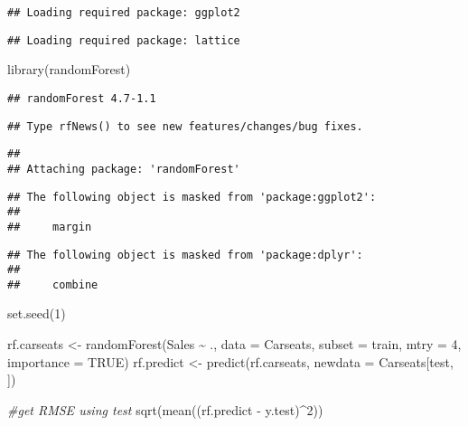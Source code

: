 \documentclass[
]{article}
\newenvironment{Shaded}{\begin{snugshade}}{\end{snugshade}}
\newcommand{\AttributeTok}[1]{\textcolor[rgb]{0.77,0.63,0.00}{#1}}
\newcommand{\CommentTok}[1]{\textcolor[rgb]{0.56,0.35,0.01}{\textit{#1}}}
\newcommand{\ConstantTok}[1]{\textcolor[rgb]{0.00,0.00,0.00}{#1}}
\newcommand{\DecValTok}[1]{\textcolor[rgb]{0.00,0.00,0.81}{#1}}
\newcommand{\FunctionTok}[1]{\textcolor[rgb]{0.00,0.00,0.00}{#1}}
\newcommand{\NormalTok}[1]{#1}
\newcommand{\OtherTok}[1]{\textcolor[rgb]{0.56,0.35,0.01}{#1}}
\newcommand{\SpecialCharTok}[1]{\textcolor[rgb]{0.00,0.00,0.00}{#1}}
\begin{document}
\begin{verbatim}
## Loading required package: ggplot2
\end{verbatim}

\begin{verbatim}
## Loading required package: lattice
\end{verbatim}

\begin{Shaded}
\begin{Highlighting}[]
\FunctionTok{library}\NormalTok{(randomForest)}
\end{Highlighting}
\end{Shaded}

\begin{verbatim}
## randomForest 4.7-1.1
\end{verbatim}

\begin{verbatim}
## Type rfNews() to see new features/changes/bug fixes.
\end{verbatim}

\begin{verbatim}
## 
## Attaching package: 'randomForest'
\end{verbatim}

\begin{verbatim}
## The following object is masked from 'package:ggplot2':
## 
##     margin
\end{verbatim}

\begin{verbatim}
## The following object is masked from 'package:dplyr':
## 
##     combine
\end{verbatim}

\begin{Shaded}
\begin{Highlighting}[]
\FunctionTok{set.seed}\NormalTok{(}\DecValTok{1}\NormalTok{)}

\NormalTok{rf.carseats }\OtherTok{\textless{}{-}} \FunctionTok{randomForest}\NormalTok{(Sales }\SpecialCharTok{\textasciitilde{}}\NormalTok{ ., }\AttributeTok{data =}\NormalTok{ Carseats, }\AttributeTok{subset =}\NormalTok{ train, }\AttributeTok{mtry =} \DecValTok{4}\NormalTok{, }\AttributeTok{importance =} \ConstantTok{TRUE}\NormalTok{)  }
\NormalTok{rf.predict }\OtherTok{\textless{}{-}} \FunctionTok{predict}\NormalTok{(rf.carseats, }\AttributeTok{newdata =}\NormalTok{ Carseats[test, ])}

\CommentTok{\#get RMSE using test}
\FunctionTok{sqrt}\NormalTok{(}\FunctionTok{mean}\NormalTok{((rf.predict }\SpecialCharTok{{-}}\NormalTok{ y.test)}\SpecialCharTok{\^{}}\DecValTok{2}\NormalTok{))}
\end{Highlighting}
\end{Shaded}
\end{document}
